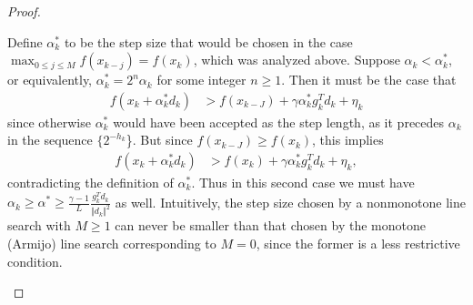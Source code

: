 \documentclass[]{interact}
\theoremstyle{plain}%
\theoremstyle{definition}
\theoremstyle{remark}
\begin{document}
\begin{proof}
\begin{enumerate}
Define $\alpha_k^*$ to be the step size that would be chosen in the case  $\displaystyle \max_{0 \leq j \leq M} f(x_{k-j}) = f(x_k)$, which was analyzed above. Suppose $\alpha_k < \alpha_k^*$, or equivalently, $\alpha_k^* = 2^n \alpha_k$ for some integer $n \geq 1$. Then it must be the case that
\begin{align*}
f(x_k + \alpha_k^* d_k) &> f(x_{k-J}) + \gamma \alpha_k^* g_k^T d_k + \eta_k
\end{align*}
since otherwise $\alpha_k^*$ would have been accepted as the step length, as it precedes $\alpha_k$ in the sequence $\{2^{-h_k}$\}. But since $f(x_{k-J}) \geq f(x_k)$, this implies
\begin{align*}
f(x_k + \alpha_k^* d_k) &> f(x_{k}) + \gamma \alpha_k^* g_k^T d_k + \eta_k,
\end{align*}
contradicting the definition of $\alpha_k^*$. Thus in this second case we must have $\displaystyle \alpha_k \geq \alpha^* \geq \frac{\gamma-1}{L} \frac{g_k^T d_k}{\Vert d_k \Vert^2}$ as well. Intuitively, the step size chosen by a nonmonotone line search with $M \geq 1$ can never be smaller than that chosen by the monotone (Armijo) line search corresponding to $M=0$, since the former is a less restrictive condition.
\end{enumerate}
\end{proof}
\end{document}
